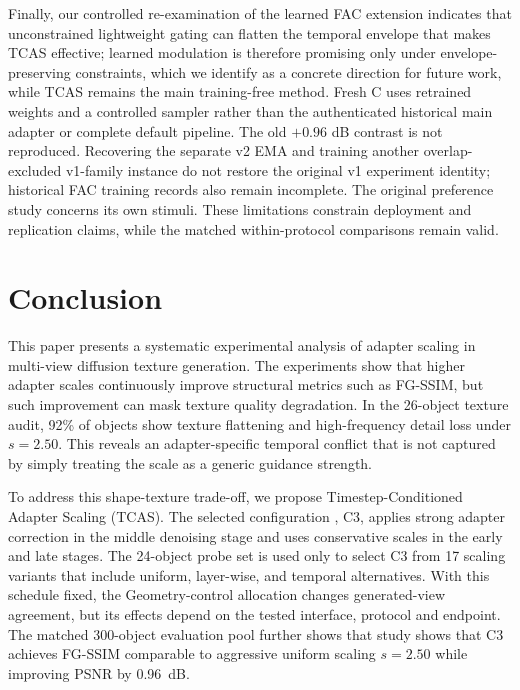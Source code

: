 \documentclass[times,twocolumn,final]{elsarticle}
\providecommand{\DIFadd}[1]{{\protect\color{blue} \sf #1}} %
\providecommand{\DIFdel}[1]{{\protect\color{red} \scriptsize #1}} %
\providecommand{\DIFaddbegin}{} %
\providecommand{\DIFaddend}{} %
\providecommand{\DIFdelbegin}{} %
\providecommand{\DIFdelend}{} %
\begin{document}
\DIFdelbegin \DIFdel{Finally, our controlled re-examination of the learned FAC extension indicates that unconstrained lightweight gating can flatten the temporal envelope that makes TCAS effective; learned modulation is therefore promising only under envelope-preserving constraints, which we identify as a concrete direction for future work, while TCAS remains the main training-free method.
}\DIFdelend \DIFaddbegin \DIFadd{Fresh C uses retrained weights and a controlled sampler rather than the authenticated historical main adapter or complete default pipeline. The old $+0.96$ dB contrast is not reproduced. Recovering the separate v2 EMA and training another overlap-excluded v1-family instance do not restore the original v1 experiment identity; historical FAC training records also remain incomplete. The original preference study concerns its own stimuli. These limitations constrain deployment and replication claims, while the matched within-protocol comparisons remain valid.
}\DIFaddend 

\section{Conclusion}
\label{sec:conclusion}

\DIFdelbegin \DIFdel{This paper presents a systematic experimental analysis of adapter scaling in multi-view diffusion texture generation. The experiments show that higher adapter scales continuously improve structural metrics such as FG-SSIM, but such improvement can mask texture quality degradation. In the 26-object texture audit, 92\% of objects show texture flattening and high-frequency detail loss under $s = 2.50$. This reveals an adapter-specific temporal conflict that is not captured by simply treating the scale as a generic guidance strength.
}%

\DIFdel{To address this shape-texture trade-off, we propose Timestep-Conditioned Adapter Scaling (TCAS). The selected configuration , C3, applies strong adapter correction in the middle denoising stage and uses conservative scales in the early and late stages. The 24-object probe set is used only to select C3 from 17 scaling variants that include uniform, layer-wise, and temporal alternatives. With this schedule fixed, the }\DIFdelend \DIFaddbegin \DIFadd{Geometry-control allocation changes generated-view agreement, but its effects depend on the tested interface, protocol and endpoint. The matched }\DIFaddend 300-object \DIFdelbegin \DIFdel{evaluation pool further shows that }\DIFdelend \DIFaddbegin \DIFadd{study shows that }\DIFaddend C3\DIFdelbegin \DIFdel{achieves FG-SSIM comparable to aggressive uniform scaling $s = 2.50$ while improving PSNR by 0.96~dB.
}%
\end{document}
